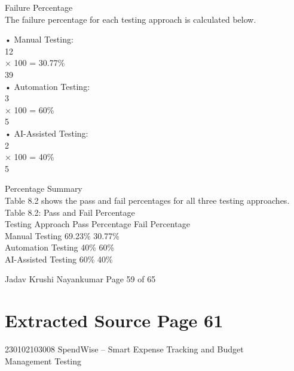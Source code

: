 \documentclass[12pt,a4paper]{report}
\begin{document}
\smallskip

 Failure Percentage\\ 

\smallskip
The failure percentage for each testing approach is calculated below.\\ 

\smallskip

\smallskip
• Manual Testing:\\ 
12\\ 
× 100 = 30.77\%\\ 
39\\ 
• Automation Testing:\\ 
3\\ 
× 100 = 60\%\\ 
5\\ 
• AI-Assisted Testing:\\ 
2\\ 
× 100 = 40\%\\ 
5\\ 

\smallskip

 Percentage Summary\\ 

\smallskip
Table 8.2 shows the pass and fail percentages for all three testing approaches.\\ 

\smallskip
Table 8.2: Pass and Fail Percentage\\ 

\smallskip
Testing Approach Pass Percentage Fail Percentage\\ 
Manual Testing              69.23\%             30.77\%\\ 
Automation Testing           40\%                  60\%\\ 
AI-Assisted Testing          60\%                  40\%\\ 

\smallskip

\smallskip

\smallskip

\smallskip
Jadav Krushi Nayankumar                                                      Page 59 of 65\\ 

\clearpage
\section*{Extracted Source Page 61}
230102103008                            SpendWise – Smart Expense Tracking and Budget\\ 
Management Testing\\ 
\end{document}
